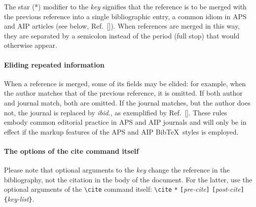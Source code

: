 \documentclass[%
 reprint,
 amsmath,amssymb,
 aps,
]{revtex4-2}
\begin{document}
The star (*) modifier to the \emph{key} signifies that the reference is to be 
merged with the previous reference into a single bibliographic entry, 
a common idiom in APS and AIP articles (see below, Ref.~[]). 
When references are merged in this way, they are separated by a semicolon instead of 
the period (full stop) that would otherwise appear.

\paragraph{Eliding repeated information}
When a reference is merged, some of its fields may be elided: for example, 
when the author matches that of the previous reference, it is omitted. 
If both author and journal match, both are omitted.
If the journal matches, but the author does not, the journal is replaced by \emph{ibid.},
as exemplified by Ref.~[]. 
These rules embody common editorial practice in APS and AIP journals and will only
be in effect if the markup features of the APS and AIP Bib\TeX\ styles is employed.

\paragraph{The options of the cite command itself}
Please note that optional arguments to the \emph{key} change the reference in the bibliography, 
not the citation in the body of the document. 
For the latter, use the optional arguments of the \verb+\cite+ command itself:
\verb+\cite+ \texttt{*}\allowbreak
\texttt{[}\emph{pre-cite}\texttt{]}\allowbreak
\texttt{[}\emph{post-cite}\texttt{]}\allowbreak
\verb+{+\emph{key-list}\verb+}+.
\end{document}
